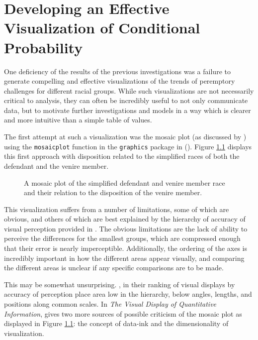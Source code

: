 \chapter{Developing an Effective Visualization of Conditional Probability} \label{app:devmob}

One deficiency of the results of the previous investigations was a failure to generate compelling and effective visualizations of
the trends of peremptory challenges for different racial groups. While such visualizations are not necessarily critical to
analysis, they can often be incredibly useful to not only communicate data, but to motivate further investigations and models in a
way which is clearer and more intuitive than a simple table of values.

The first attempt at such a visualization was the mosaic plot (as discussed by \cite{friendly1994}) using the \texttt{mosaicplot}
function in the \texttt{graphics} package in \Rp (\cite{Rcite}). Figure \ref{fig:mosaicdefrace} displays this first approach with
disposition related to the simplified races of both the defendant and the venire member.

\begin{figure}[!h]
  \centering
  \caption[Mosaic Plot of Defendant and Venire Member Race]{A mosaic plot of the simplified defendant and venire member race and
    their relation to the disposition of the venire member.}
  \label{fig:mosaicdefrace}
\end{figure}

This visualization suffers from a number of limitations, some of which are obvious, and others of which are best explained by
the hierarchy of accuracy of visual perception provided in \cite{cleveland1987}. The obvious limitations are the lack of ability
to perceive the differences for the smallest groups, which are compressed enough that their error is nearly
imperceptible. Additionally, the ordering of the axes is incredibly important in how the different areas appear visually, and
comparing the different areas is unclear if any specific comparisons are to be made.

This may be somewhat unsurprising. \cite{cleveland1987}, in their ranking of visual displays by accuracy of perception place area
low in the hierarchy, below angles, lengths, and positions along common scales. In \textit{The Visual Display of Quantitative
  Information}, \citeauthor{VisualDisplayQuant} gives two more sources of possible criticism of the mosaic plot as displayed in
Figure \ref{fig:mosaicdefrace}: the concept of data-ink and the dimensionality of visualization.

